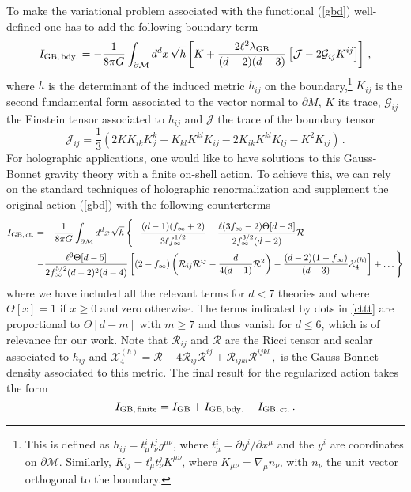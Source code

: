 \documentclass[12pt]{article}
\numberwithin{equation}{section}
\newcommand{\req}[1]{(\ref{#1})} %
\newcommand{\labell}[1]{\label{#1}}
\begin{document}
To make the variational problem associated with the functional \req{gbd} well-defined one has to add the following boundary term \cite{Gibbons:1976ue,Myers:1987yn,Teitelboim:1987zz}
%
\begin{equation}\label{gbdbd}
I_{\rm GB,\, bdy.}= -\frac{1}{8\pi G}\int_{\mathcal{\partial M}}d^{d}x\, \sqrt{h} \left[K +\frac{2\ell^2 \lambda_{\rm GB}}{(d-2)(d-3)} \left[\mathcal{J}-2 \mathcal{G}_{ij}K^{ij} \right]\right]\, ,
\end{equation}
%
where $h$ is the determinant of the induced metric $h_{ij}$ on the boundary,\footnote{This is defined as $h_{ij}=t^i_{\mu}t^j_{\nu}g^{\mu\nu}$, where $t^i_{\mu}=\partial y^i/\partial x^{\mu}$ and the $y^i$ are coordinates on $\partial {\mathcal{M}}$. Similarly, $K_{ij}=t^i_{\mu}t^j_{\nu}K^{\mu\nu}$, where $K_{\mu\nu}=\nabla_{\mu}n_{\nu}$, with $n_{\nu}$ the unit vector orthogonal to the boundary.} $K_{ij}$ is the second fundamental form associated to the vector normal to $\partial M$, $K$ its trace, $\mathcal{G}_{ij}$ the Einstein tensor associated to $h_{ij}$ and $\mathcal{J}$ the trace of the boundary tensor
%
\begin{equation}\label{J}
\mathcal{J}_{ij}=\frac{1}{3}\left(2K K_{ik}K^{k}_{j}+K_{kl}K^{kl}K_{ij}-2K_{ik}K^{kl}K_{lj}-K^2 K_{ij} \right)\, .
\end{equation}
%
For holographic applications, one would like to have solutions to this Gauss-Bonnet gravity theory with a finite on-shell action. To achieve this, we can rely on the standard techniques of holographic renormalization \cite{Skenderis:2002wp} and supplement the original action \req{gbd} with the following counterterms \cite{Emparan:1999pm,Mann:1999pc,Balasubramanian:1999re,Brihaye:2008xu}
%
\begin{align}\label{cttt}
 I_{\rm GB,\, ct.}&= -\frac{1}{8\pi G}\int_{\mathcal{\partial M}}d^{d}x\, \sqrt{h} \left\{-\frac{(d-1)(f_{\infty}+2)}{3\ell f_{\infty}^{1/2}}-\frac{\ell (3f_{\infty}-2)\Theta[d-3]}{2f_{\infty}^{3/2}(d-2)}\mathcal{R} \right. \\ \notag   &\left. -\frac{\ell^3\Theta[d-5]}{2 f_{\infty}^{5/2}(d-2)^2(d-4)}\left[(2-f_{\infty})\left(\mathcal{R}_{ij}\mathcal{R}^{ij}-\frac{d}{4(d-1)}\mathcal{R}^2 \right)-\frac{(d-2)(1-f_{\infty})}{(d-3)} \mathcal{X}_4^{(h)}\right]+\dots\, 
 \right\}
\end{align}
%
where we have included all the relevant terms for $d<7$ theories and where $\Theta[x]=1$ if $x\geq 0$ and zero otherwise. The terms indicated by dots in \eqref{cttt} are proportional to $\Theta[d-m]$ with $m\geq  7$ and thus vanish for $d\leq6$, which is of relevance for our work. Note that $\mathcal{R}_{ij}$ and $\mathcal{R}$ are the Ricci tensor and scalar associated to $h_{ij}$ and $
\mathcal{X}_4^{(h)}=\mathcal{R}-4\mathcal{R}_{ij}\mathcal{R}^{ij}+\mathcal{R}_{ijkl}\mathcal{R}^{ijkl}\, ,
$
%
is the Gauss-Bonnet density associated to this metric. The final result for the regularized action takes the form
%
\begin{equation}\labell{osa}
 I_{\rm GB,\, finite}=I_{\rm GB}+I_{\rm GB,\, bdy.}+ I_{\rm GB,\, ct.}\, .
\end{equation}
%
\end{document}
